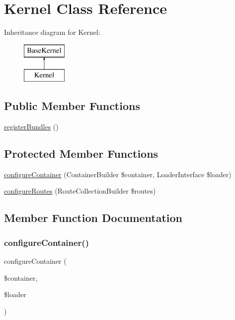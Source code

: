 \hypertarget{class_app_1_1_kernel}{}\section{Kernel Class Reference}
\label{class_app_1_1_kernel}
Inheritance diagram for Kernel\+:\begin{figure}[H]
\begin{center}
\leavevmode
\includegraphics[height=2.000000cm]{class_app_1_1_kernel}
\end{center}
\end{figure}
\subsection*{Public Member Functions}
\begin{DoxyCompactItemize}
\item 
\mbox{\hyperlink{class_app_1_1_kernel_a8dd304e2eccfbe88dd648389c7d4f5eb}{register\+Bundles}} ()
\end{DoxyCompactItemize}
\subsection*{Protected Member Functions}
\begin{DoxyCompactItemize}
\item 
\mbox{\hyperlink{class_app_1_1_kernel_a8309831536a0535383e4d41657b54635}{configure\+Container}} (Container\+Builder \$container, Loader\+Interface \$loader)
\item 
\mbox{\hyperlink{class_app_1_1_kernel_a07bf0718482c124f9f0df16ddfa4329b}{configure\+Routes}} (Route\+Collection\+Builder \$routes)
\end{DoxyCompactItemize}


\subsection{Member Function Documentation}
\mbox{\label{class_app_1_1_kernel_a8309831536a0535383e4d41657b54635}} 
\subsubsection{\texorpdfstring{configureContainer()}{configureContainer()}}
{\footnotesize\ttfamily configure\+Container (\begin{DoxyParamCaption}\item[{Container\+Builder}]{\$container,  }\item[{Loader\+Interface}]{\$loader }\end{DoxyParamCaption})\hspace{0.3cm}{\ttfamily [protected]}}

